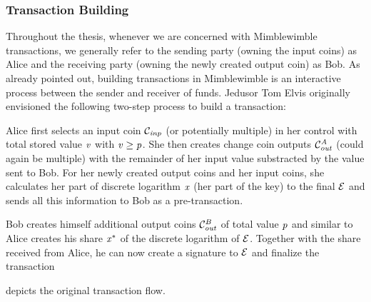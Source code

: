 \subsubsection{Transaction Building} \label{subsec:pre:mimblewimble:txbuild}
Throughout the thesis, whenever we are concerned with Mimblewimble transactions, we generally refer to the sending party (owning the input coins) as Alice and the receiving party (owning the newly created output coin) as Bob.
As already pointed out, building transactions in Mimblewimble is an interactive process between the sender and receiver of funds.
Jedusor Tom Elvis originally envisioned the following two-step process to build a transaction:~\cite{jedusor2016mimblewimble}
\begin{asparaenum}
    \item Alice first selects an input coin $\mathcal{C}_{\mathit{inp}}$ (or potentially multiple) in her control with total stored value $\mathit{v}$ with $\mathit{v} \geq \mathit{p}$.
    She then creates change coin outputs $\mathcal{C}_{\mathit{out}}^{\mathit{A}}$ (could again be multiple) with the remainder of her input value substracted by the value sent to Bob.
    For her newly created output coins and her input coins, she calculates her part of discrete logarithm $\mathit{x}$ (her part of the key) to the final $\mathcal{E}$ and sends all this information to Bob as a pre-transaction.
    \item Bob creates himself additional output coins $\mathcal{C}_{\mathit{out}}^B$ of total value $\mathit{p}$ and similar to Alice creates his share $\mathit{x}^*$ of the discrete logarithm of $\mathcal{E}$.
    Together with the share received from Alice, he can now create a signature to $\mathcal{E}$ and finalize the transaction
\end{asparaenum}
 depicts the original transaction flow.\\

